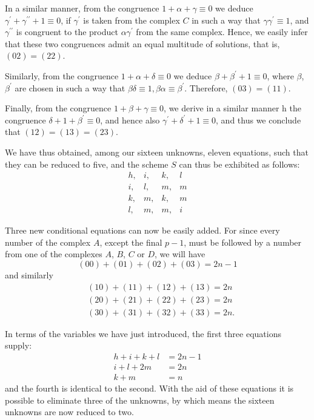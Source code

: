 \documentclass[twoside,12pt]{memoir}
\begin{document}
In a similar manner, from the congruence \(1+\alpha+\gamma \equiv 0\) we deduce \(\gamma^{\prime}+\gamma^{\prime \prime}+1 \equiv 0\), if \(\gamma^{\prime}\) is taken from the complex \(C\) in such a way that \(\gamma \gamma^{\prime} \equiv 1\), and \(\gamma^{\prime \prime}\) is congruent to the product \(\alpha \gamma^{\prime}\) from the same complex. Hence, we easily infer that these two congruences admit an equal multitude of solutions, that is, \((02) = (22)\).

Similarly, from the congruence \(1+\alpha+\delta \equiv 0\) we deduce \(\beta+\beta^{\prime}+1 \equiv 0\), where \(\beta\), \(\beta^{\prime}\) are chosen in such a way that \(\beta \delta \equiv 1, \beta \alpha \equiv \beta^{\prime}\). Therefore, \((03) = (11)\).

Finally, from the congruence \(1+\beta+\gamma \equiv 0\), we derive in a similar manner h the congruence \(\delta+1+\beta^{\prime} \equiv 0\), and hence also \(\gamma^{\prime}+\delta^{\prime}+1 \equiv 0\), and thus we conclude that \((12) = (13) = (23)\).

We have thus obtained, among our sixteen unknowns, eleven equations, such that they can be reduced to five, and the scheme \(S\) can thus be exhibited as follows:
\[\begin{array}{llll}
h, & i, & k, & l \\
i, & l, & m, & m \\
k, & m, & k, & m \\
l, & m, & m, & i
\end{array}\]

Three new conditional equations can now be easily added. For since every number of the complex \(A\), except the final \(p-1\), must be followed by a number from one of the complexes \(A\), \(B\), \(C\) or \(D\), we will have
\[(00)+(01)+(02)+(03)=2n-1\]
and similarly
\[\begin{aligned}
&(10)+(11)+(12)+(13)=2n \\
&(20)+(21)+(22)+(23)=2n \\
&(30)+(31)+(32)+(33)=2n.
\end{aligned}\]

In terms of the variables we have just introduced, the first three equations supply:
\[\begin{aligned}
h+i+k+l & =2n-1 \\
i+l+2m & =2n \\
k+m & =n
\end{aligned}\]\pagebreak%
and the fourth is identical to the second.  With the aid of these equations it is possible to eliminate three of the unknowns, by which means the sixteen unknowns are now reduced to two.
\end{document}
